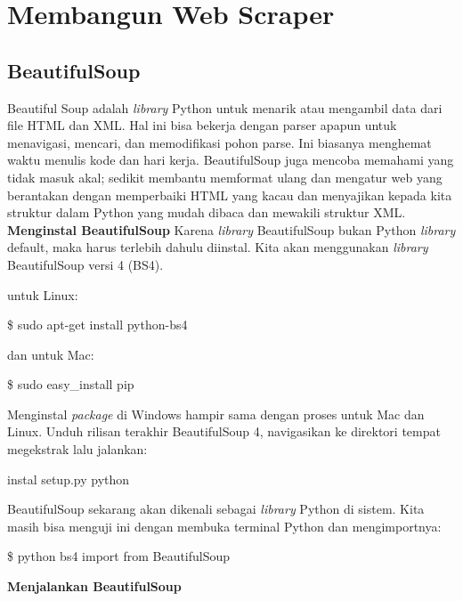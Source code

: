 \section{Membangun Web Scraper}
\subsection{BeautifulSoup}
\par Beautiful Soup adalah \textit{library} Python untuk menarik atau mengambil data dari file HTML dan XML. Hal ini bisa bekerja dengan parser apapun untuk menavigasi, mencari, dan memodifikasi pohon parse. Ini biasanya menghemat waktu menulis kode dan hari kerja. BeautifulSoup juga mencoba memahami yang tidak masuk akal; sedikit membantu memformat ulang dan mengatur web yang berantakan dengan memperbaiki HTML yang kacau dan menyajikan kepada kita struktur dalam Python yang mudah dibaca dan mewakili struktur XML.
\textbf{Menginstal BeautifulSoup}
Karena \textit{library} BeautifulSoup bukan Python \textit{library} default, maka harus terlebih dahulu diinstal. Kita akan menggunakan \textit{library} BeautifulSoup versi 4 (BS4).

untuk Linux:

\$ sudo apt-get install python-bs4

dan untuk Mac:

\$ sudo easy\_install pip

Menginstal \textit{package} di Windows hampir sama dengan proses untuk Mac dan Linux. Unduh rilisan terakhir BeautifulSoup 4, navigasikan ke direktori tempat megekstrak lalu jalankan:

instal setup.py python

BeautifulSoup sekarang akan dikenali sebagai \textit{library} Python di sistem. Kita masih bisa menguji ini dengan membuka terminal Python dan mengimportnya:

\begin{algorithm}

\$ python
bs4 import from BeautifulSoup
\end{algorithm}


\textbf{Menjalankan BeautifulSoup}

